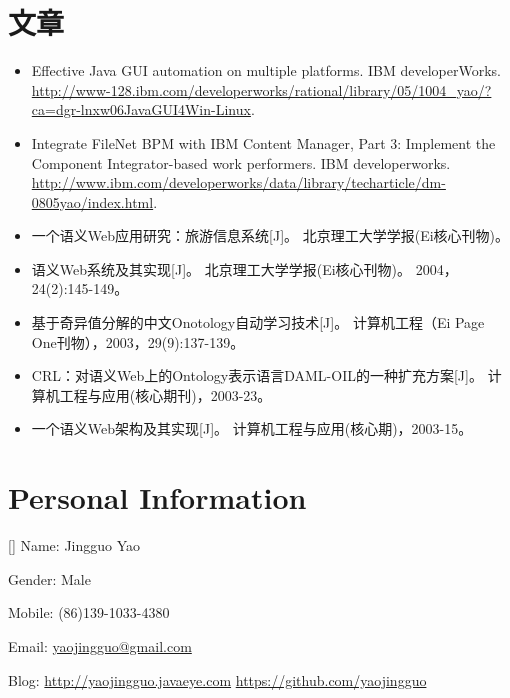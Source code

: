\documentclass[a4paper]{article}
\newenvironment{DUlineblock}[1]{%
    \list{}{\setlength{\partopsep}{\parskip}
            \addtolength{\partopsep}{\baselineskip}
            \setlength{\topsep}{0pt}
            \setlength{\itemsep}{0.15\baselineskip}
            \setlength{\parsep}{0pt}
            \setlength{\leftmargin}{#1}}
    \raggedright
  }
  {\endlist}
\begin{document}
\begin{CJK}{UTF8}{gkai}
\section*{文章}
\begin{itemize}
\item Effective Java GUI automation on multiple platforms. IBM developerWorks.
\url{http://www-128.ibm.com/developerworks/rational/library/05/1004_yao/?ca=dgr-lnxw06JavaGUI4Win-Linux}.
\item Integrate FileNet BPM with IBM Content Manager,
Part 3: Implement the Component Integrator-based work performers.
IBM developerworks.
\url{http://www.ibm.com/developerworks/data/library/techarticle/dm-0805yao/index.html}.
\item 一个语义Web应用研究：旅游信息系统{[}J{]}。 北京理工大学学报(Ei核心刊物)。
\item 语义Web系统及其实现{[}J{]}。 北京理工大学学报(Ei核心刊物)。 2004，24(2):145-149。
\item 基于奇异值分解的中文Onotology自动学习技术{[}J{]}。 计算机工程（Ei Page One刊物），2003，29(9):137-139。
\item CRL：对语义Web上的Ontology表示语言DAML-OIL的一种扩充方案{[}J{]}。 计算机工程与应用(核心期刊)，2003-23。
\item 一个语义Web架构及其实现{[}J{]}。 计算机工程与应用(核心期)，2003-15。
\end{itemize}

\newpage


\section*{Personal Information}
\begin{DUlineblock}{0em}
\item[] Name:   Jingguo Yao
\item[] Gender: Male
\item[] Mobile: (86)139-1033-4380
\item[] Email:  \href{mailto:yaojingguo@gmail.com}{yaojingguo@gmail.com}
\item[] Blog:   \url{http://yaojingguo.javaeye.com}
\url{https://github.com/yaojingguo}
\end{DUlineblock}



\end{CJK}
\end{document}
